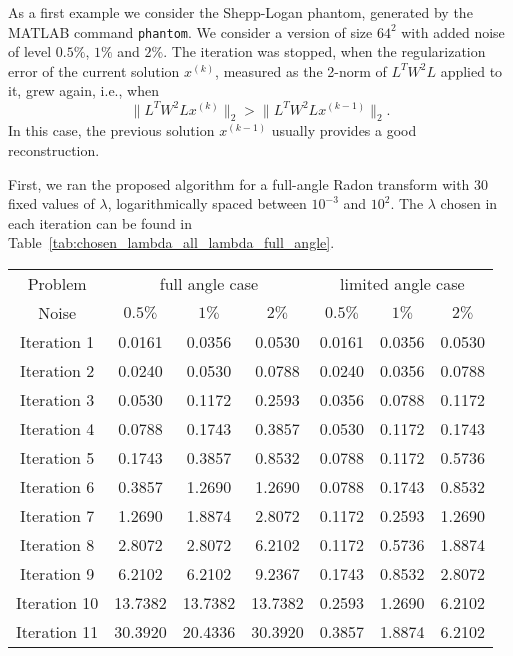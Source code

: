 As a first example we consider the Shepp-Logan phantom, generated by
the MATLAB command \texttt{phantom}. We consider a version of size
$64^2$ with added noise of level $0.5\%$, $1\%$ and $2\%$. The
iteration was stopped, when the regularization error of the current
solution $x^{(k)}$, measured as the 2-norm of $L^TW^2L$ applied to it,
grew again, i.e., when
\[
  \| L^TW^2L x^{(k)} \|_2 > \| L^TW^2L x^{(k-1)} \|_2.
\]
In this case, the previous solution $x^{(k-1)}$ usually provides a
good reconstruction.

First, we ran the proposed algorithm for a full-angle Radon transform
with 30 fixed values of $\lambda$, logarithmically spaced between
$10^{-3}$ and $10^2$. The $\lambda$ chosen in each iteration can be
found in Table~\ref{tab:chosen_lambda_all_lambda_full_angle}.

\begin{table}
  \begin{center}
    \begin{tabular}{c|ccc|ccc}
      Problem & \multicolumn{3}{|c}{full angle case} &
                                                       \multicolumn{3}{|c}{limited
                                                       angle case} \\
      Noise & $0.5\%$ & $1\%$ & $2\%$ & $0.5\%$ & $1\%$ & $2\%$ \\
      \hline
      Iteration 1 & 0.0161 & 0.0356 & 0.0530 & 0.0161 & 0.0356 & 0.0530 \\
      Iteration 2 & 0.0240 & 0.0530 & 0.0788 & 0.0240 & 0.0356 & 0.0788 \\
      Iteration 3 & 0.0530 & 0.1172 & 0.2593 & 0.0356 & 0.0788 & 0.1172 \\
      Iteration 4 & 0.0788 & 0.1743 & 0.3857 & 0.0530 & 0.1172 & 0.1743 \\
      Iteration 5 & 0.1743 & 0.3857 & 0.8532 & 0.0788 & 0.1172 & 0.5736 \\
      Iteration 6 & 0.3857 & 1.2690 & 1.2690 & 0.0788 & 0.1743 & 0.8532 \\
      Iteration 7 & 1.2690 & 1.8874 & 2.8072 & 0.1172 & 0.2593 & 1.2690 \\
      Iteration 8 & 2.8072 & 2.8072 & 6.2102 & 0.1172 & 0.5736 & 1.8874 \\
      Iteration 9 & 6.2102 & 6.2102 & 9.2367 & 0.1743 & 0.8532 & 2.8072 \\
      Iteration 10 & 13.7382 & 13.7382 & 13.7382 & 0.2593 & 1.2690 & 6.2102 \\
      Iteration 11 & 30.3920 & 20.4336 & 30.3920 & 0.3857 & 1.8874 & 6.2102 \\

\end{tabular}
\end{center}
\end{table}
